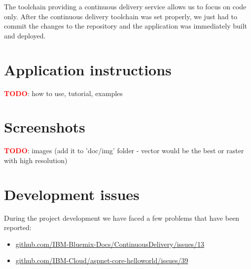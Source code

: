 \documentclass[11pt,a4paper]{article}
\newcommand{\TODO}{\textbf{\textcolor{red}{TODO}}} %
\begin{document}
The toolchain providing a continuous delivery service allows us to focus on code only. After the continuous delivery toolchain was set properly, we just had to commit the changes to the repository and the application was immediately built and deployed.

\section{Application instructions}

\TODO: how to use, tutorial, examples

\section{Screenshots}

\TODO: images (add it to 'doc/img' folder - vector would be the best or raster with high resolution)

\section{Development issues}

During the project development we have faced a few problems that have been reported:
\begin{itemize}
    \item \href{https://github.com/IBM-Bluemix-Docs/ContinuousDelivery/issues/13}{github.com/IBM-Bluemix-Docs/ContinuousDelivery/issues/13}
    \item \href{https://github.com/IBM-Cloud/aspnet-core-helloworld/issues/39}{github.com/IBM-Cloud/aspnet-core-helloworld/issues/39}
\end{itemize}
\end{document}
